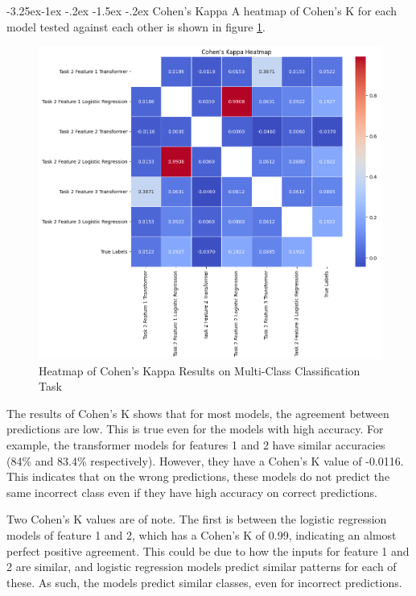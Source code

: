 \documentclass[10.7pt, onecolumn]{article}
\makeatletter
\renewcommand\subsubsection{\@startsection{subsubsection}{3}{\z@}%
	{-3.25ex\@plus -1ex \@minus -.2ex}%
    {-1.5ex \@plus -.2ex}%
    {\normalfont\itshape}}
\makeatother
\begin{document}
\subsubsection{Cohen's Kappa}
A heatmap of Cohen's K for each model tested against each other is shown in figure \ref{fig:cohenK}.
\begin{figure}[H]
  \centering
  \includegraphics[]{images/CohensK.png}
  \caption{Heatmap of Cohen's Kappa Results on Multi-Class Classification Task}
  \label{fig:cohenK}
\end{figure}

The results of Cohen's K shows that for most models, the agreement between predictions are low. This is true even for the models with high accuracy. For example, the transformer models for features 1 and 2 have similar accuracies (84\% and 83.4\% respectively). However, they have a Cohen's K value of -0.0116. This indicates that on the wrong predictions, these models do not predict the same incorrect class even if they have high accuracy on correct predictions.

Two Cohen's K values are of note. The first is between the logistic regression models of feature 1 and 2, which has a Cohen's K of 0.99, indicating an almost perfect positive agreement. This could be due to how the inputs for feature 1 and 2 are similar, and logistic regression models predict similar patterns for each of these. As such, the models predict similar classes, even for incorrect predictions.
\end{document}
